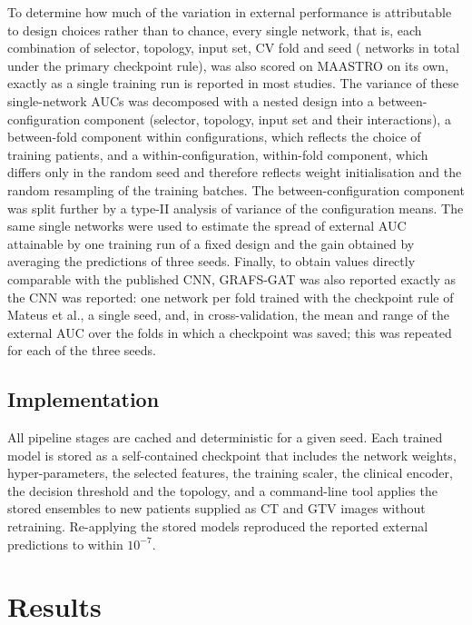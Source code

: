 \documentclass[11pt,a4paper]{article}
\newcommand{\method}{GRAFS-GAT}
\begin{document}
To determine how much of the variation in external performance is attributable to design choices rather than to chance, every single network, that is, each combination of selector, topology, input set, CV fold and seed (\vcNmodels{} networks in total under the primary checkpoint rule), was also scored on MAASTRO on its own, exactly as a single training run is reported in most studies. The variance of these single-network AUCs was decomposed with a nested design into a between-configuration component (selector, topology, input set and their interactions), a between-fold component within configurations, which reflects the choice of training patients, and a within-configuration, within-fold component, which differs only in the random seed and therefore reflects weight initialisation and the random resampling of the training batches. The between-configuration component was split further by a type-II analysis of variance of the configuration means. The same single networks were used to estimate the spread of external AUC attainable by one training run of a fixed design and the gain obtained by averaging the predictions of three seeds. Finally, to obtain values directly comparable with the published CNN, \method{} was also reported exactly as the CNN was reported: one network per fold trained with the checkpoint rule of Mateus et al., a single seed, and, in cross-validation, the mean and range of the external AUC over the folds in which a checkpoint was saved; this was repeated for each of the three seeds.

\subsection{Implementation}
All pipeline stages are cached and deterministic for a given seed. Each trained model is stored as a self-contained checkpoint that includes the network weights, hyper-parameters, the selected features, the training scaler, the clinical encoder, the decision threshold and the topology, and a command-line tool applies the stored ensembles to new patients supplied as CT and GTV images without retraining. Re-applying the stored models reproduced the reported external predictions to within $10^{-7}$.

\section{Results}\label{sec:results}
\end{document}
